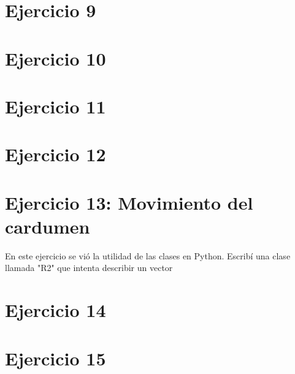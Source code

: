 \section*{Ejercicio 9}


\section*{Ejercicio 10}


\section*{Ejercicio 11}


\section*{Ejercicio 12}


\section*{Ejercicio 13: Movimiento del cardumen}

En este ejercicio se vió la utilidad de las clases en Python. Escribí una clase llamada "R2" que intenta describir un vector


\section*{Ejercicio 14}


\section*{Ejercicio 15}



